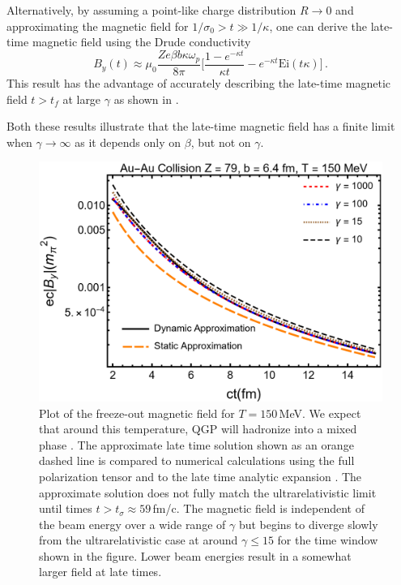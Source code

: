 Alternatively, by assuming a point-like charge distribution $R\rightarrow0$ and approximating the magnetic field for $ 1/\sigma_0 > t\gg 1/\kappa$, one can derive the late-time magnetic field using the Drude conductivity 
\begin{equation}\label{eq:latetimeB}
   B_y(t) \approx  \mu_0 \frac{ Ze \beta b \kappa \omega_p }{8\pi}\bigg[ \frac{1- e^{-\kappa t}}{\kappa t} - e^{-\kappa t} \text{Ei}\left(t\kappa\right)\bigg]\,.
\end{equation}
This result has the advantage of accurately describing the late-time magnetic field $t>t_f$  at large $\gamma$ as shown in .

Both these results illustrate that the late-time magnetic field has a finite limit when $\gamma\rightarrow\infty$ as it depends only on $\beta$, but not on $\gamma$.
\begin{figure}
\centering
\includegraphics[width=0.85\linewidth]{plots/chap02QCD/bfgaamacomp.png}
    \caption{Plot of the freeze-out magnetic field for $T= 150$\,MeV. We expect that around this temperature, QGP will hadronize into a mixed phase \cite{Letessier:1992xd}. The approximate late time solution  shown as an orange dashed line is compared to numerical calculations using the full polarization tensor  and to the late time analytic expansion . The approximate solution does not fully match the ultrarelativistic limit until times $t > t_{\sigma} \approx 59$\,fm/c. The magnetic field is independent of the beam energy over a wide range of $\gamma$ but begins to diverge slowly from the ultrarelativistic case at around $\gamma \leq 15$ for the time window shown in the figure. Lower beam energies result in a somewhat larger field at late times. \label{fig:bcolcomp}}
\end{figure}
